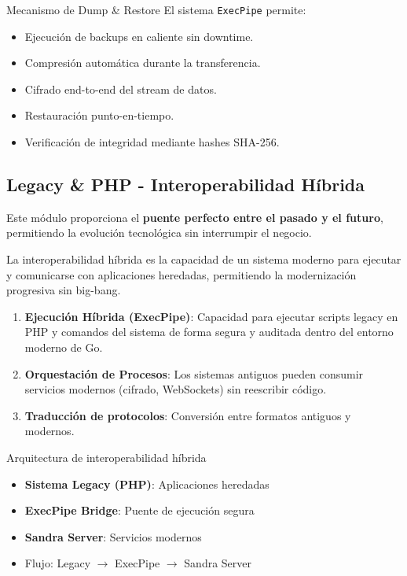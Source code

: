\begin{caja}{Mecanismo de Dump \& Restore}
El sistema \texttt{ExecPipe} permite:
\begin{itemize}
\item Ejecución de backups en caliente sin downtime.
\item Compresión automática durante la transferencia.
\item Cifrado end-to-end del stream de datos.
\item Restauración punto-en-tiempo.
\item Verificación de integridad mediante hashes SHA-256.
\end{itemize}
\end{caja}

\subsection{Legacy \& PHP - Interoperabilidad Híbrida}

Este módulo proporciona el \textbf{puente perfecto entre el pasado y el futuro}, permitiendo la evolución tecnológica sin interrumpir el negocio.

\begin{definicion}
La interoperabilidad híbrida es la capacidad de un sistema moderno para ejecutar y comunicarse con aplicaciones heredadas, permitiendo la modernización progresiva sin big-bang.
\end{definicion}

\begin{enumerate}
\item \textbf{Ejecución Híbrida (ExecPipe)}: Capacidad para ejecutar scripts legacy en PHP y comandos del sistema de forma segura y auditada dentro del entorno moderno de Go.
\item \textbf{Orquestación de Procesos}: Los sistemas antiguos pueden consumir servicios modernos (cifrado, WebSockets) sin reescribir código.
\item \textbf{Traducción de protocolos}: Conversión entre formatos antiguos y modernos.
\end{enumerate}

\begin{caja}{Arquitectura de interoperabilidad híbrida}
\begin{itemize}
\item \textbf{Sistema Legacy (PHP)}: Aplicaciones heredadas
\item \textbf{ExecPipe Bridge}: Puente de ejecución segura
\item \textbf{Sandra Server}: Servicios modernos
\item Flujo: Legacy $\rightarrow$ ExecPipe $\rightarrow$ Sandra Server
\end{itemize}
\end{caja}

